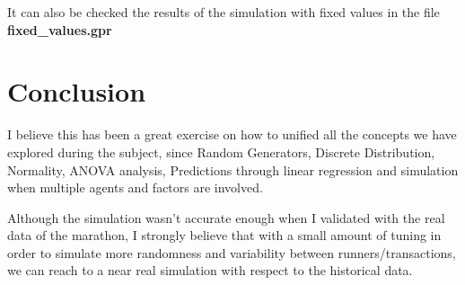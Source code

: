 \documentclass[12pt, a4paper]{article}
\begin{document}
It can also be checked the results of the simulation with fixed values in the
file \textbf{fixed\_values.gpr}


\section{Conclusion}
I believe this has been a great exercise on how to unified all the concepts we
have explored during the subject, since Random Generators, Discrete
Distribution, Normality, ANOVA analysis, Predictions through linear regression
and simulation when multiple agents and factors are involved.

Although the simulation wasn't accurate enough when I validated with the real
data of the marathon, I strongly believe that with a small amount of tuning in
order to simulate more randomness and variability between runners/transactions,
we can reach to a near real simulation with respect to the historical data.
\end{document}
